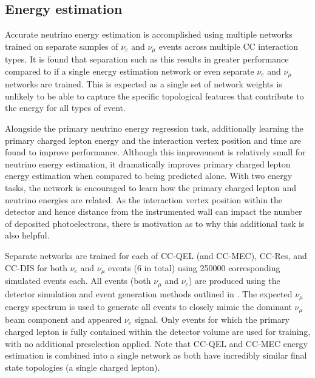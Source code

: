 \subsection{Energy estimation} %
\label{sec:cnn_specific_energy} %

Accurate neutrino energy estimation is accomplished using multiple networks trained on separate
samples of $\nu_{e}$ and $\nu_{\mu}$ events across multiple CC interaction types. It is found that
separation such as this results in greater performance compared to if a single energy estimation
network or even separate $\nu_{e}$ and $\nu_{\mu}$ networks are trained. This is expected as a
single set of network weights is unlikely to be able to capture the specific topological features
that contribute to the energy for all types of event.

Alongside the primary neutrino energy regression task, additionally learning the primary charged
lepton energy and the interaction vertex position and time are found to improve performance.
Although this improvement is relatively small for neutrino energy estimation, it dramatically
improves primary charged lepton energy estimation when compared to being predicted alone. With two
energy tasks, the network is encouraged to learn how the primary charged lepton and neutrino
energies are related. As the interaction vertex position within the detector and hence distance
from the instrumented wall can impact the number of deposited photoelectrons, there is motivation
as to why this additional task is also helpful.

Separate networks are trained for each of CC-QEL (and CC-MEC), CC-Res, and CC-DIS for both
$\nu_{e}$ and $\nu_{\mu}$ events (6 in total) using 250000 corresponding simulated events each.
All events (both $\nu_{\mu}$ and $\nu_{e}$) are produced using the detector simulation and event
generation methods outlined in . The expected \chipsfive
$\nu_{\mu}$ energy spectrum is used to generate all events to closely mimic the dominant
$\nu_{\mu}$ beam component and appeared $\nu_{e}$ signal. Only events for which the primary
charged lepton is fully contained within the detector volume are used for training, with no
additional preselection applied. Note that CC-QEL and CC-MEC energy estimation is combined into a
single network as both have incredibly similar final state topologies (a single charged lepton).

